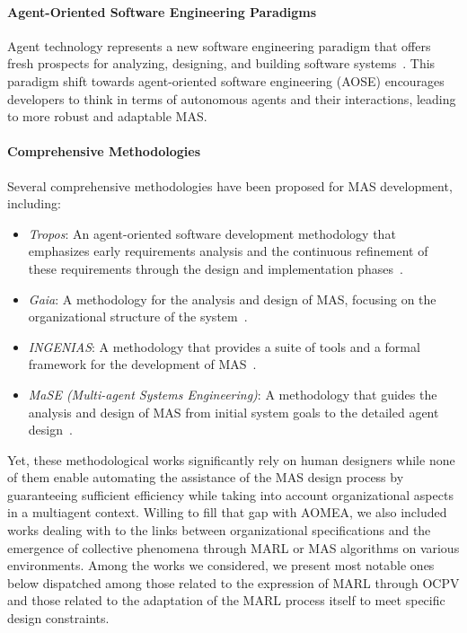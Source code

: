 \documentclass[runningheads]{llncs}
\begin{document}
\paragraph{\textbf{Agent-Oriented Software Engineering Paradigms}}

Agent technology represents a new software engineering paradigm that offers fresh prospects for analyzing, designing, and building software systems~\cite{Li2016}. This paradigm shift towards agent-oriented software engineering (AOSE) encourages developers to think in terms of autonomous agents and their interactions, leading to more robust and adaptable MAS.

\paragraph{\textbf{Comprehensive Methodologies}}

Several comprehensive methodologies have been proposed for MAS development, including:

\begin{itemize}
    \item \emph{Tropos}: An agent-oriented software development methodology that emphasizes early requirements analysis and the continuous refinement of these requirements through the design and implementation phases~\cite{Bresciani2004}.
    \item \emph{Gaia}: A methodology for the analysis and design of MAS, focusing on the organizational structure of the system~\cite{Zambonelli2003}.
    \item \emph{INGENIAS}: A methodology that provides a suite of tools and a formal framework for the development of MAS~\cite{Pavon2003}.
    \item \emph{MaSE (Multi-agent Systems Engineering)}: A methodology that guides the analysis and design of MAS from initial system goals to the detailed agent design~\cite{Scott2004}.
\end{itemize}

Yet, these methodological works significantly rely on human designers while none of them enable automating the assistance of the MAS design process by guaranteeing sufficient efficiency while taking into account organizational aspects in a multiagent context.
Willing to fill that gap with AOMEA, we also included works dealing with to the links between organizational specifications and the emergence of collective phenomena through MARL or MAS algorithms on various environments.
Among the works we considered, we present most notable ones below dispatched among those related to the expression of MARL through OCPV and those related to the adaptation of the MARL process itself to meet specific design constraints.
\end{document}
